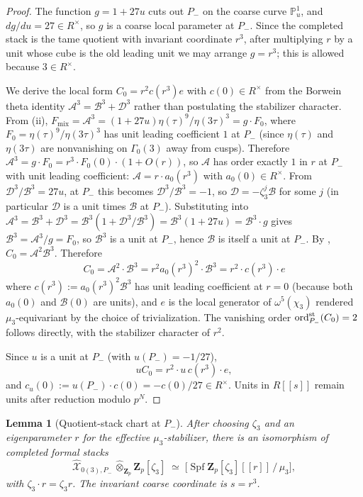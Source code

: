 \documentclass[11pt]{amsart}
\newtheorem{lemma}[theorem]{Lemma}
\theoremstyle{definition}
\theoremstyle{remark}
\newcommand{\Z}{\mathbf{Z}}
\newcommand{\ord}{\operatorname{ord}}
\begin{document}
\begin{proof}
The function $g=1+27u$ cuts out $P_-$ on the coarse curve $\mathbb P^1_u$, and $dg/du=27\in R^\times$, so $g$ is a coarse local parameter at $P_-$. Since the completed stack is the tame quotient with invariant coordinate $r^3$, after multiplying $r$ by a unit whose cube is the old leading unit we may arrange $g=r^3$; this is allowed because $3\in R^\times$.

We derive the local form $C_0=r^2c(r^3)e$ with $c(0)\in R^\times$ from the Borwein theta identity $\mathcal A^3=\mathcal B^3+\mathcal D^3$ rather than postulating the stabilizer character. From (ii), $F_{\mathrm{mix}}=\mathcal A^3=(1+27u)\eta(\tau)^9/\eta(3\tau)^3=g\cdot F_0$, where $F_0=\eta(\tau)^9/\eta(3\tau)^3$ has unit leading coefficient $1$ at $P_-$ (since $\eta(\tau)$ and $\eta(3\tau)$ are nonvanishing on $\Gamma_0(3)$ away from cusps). Therefore $\mathcal A^3=g\cdot F_0=r^3\cdot F_0(0)\cdot(1+O(r))$, so $\mathcal A$ has order exactly $1$ in $r$ at $P_-$ with unit leading coefficient: $\mathcal A=r\cdot a_0(r^3)$ with $a_0(0)\in R^\times$. From $\mathcal D^3/\mathcal B^3=27u$, at $P_-$ this becomes $\mathcal D^3/\mathcal B^3=-1$, so $\mathcal D=-\zeta_3^j\mathcal B$ for some $j$ (in particular $\mathcal D$ is a unit times $\mathcal B$ at $P_-$). Substituting into $\mathcal A^3=\mathcal B^3+\mathcal D^3=\mathcal B^3(1+\mathcal D^3/\mathcal B^3)=\mathcal B^3(1+27u)=\mathcal B^3\cdot g$ gives $\mathcal B^3=\mathcal A^3/g=F_0$, so $\mathcal B^3$ is a unit at $P_-$, hence $\mathcal B$ is itself a unit at $P_-$. By , $C_0=\mathcal A^2\mathcal B^3$. Therefore
\[
C_0=\mathcal A^2\cdot\mathcal B^3=r^2a_0(r^3)^2\cdot\mathcal B^3=r^2\cdot c(r^3)\cdot e
\]
where $c(r^3):=a_0(r^3)^2\mathcal B^3$ has unit leading coefficient at $r=0$ (because both $a_0(0)$ and $\mathcal B(0)$ are units), and $e$ is the local generator of $\omega^5(\chi_3)$ rendered $\mu_3$-equivariant by the choice of trivialization. The vanishing order $\ord^{\rm st}_{P_-}(C_0)=2$ follows directly, with the stabilizer character of $r^2$.

Since $u$ is a unit at $P_-$ (with $u(P_-)=-1/27$),
\[
uC_0=r^2\cdot u\,c(r^3)\cdot e,
\]
and $c_u(0):=u(P_-)\cdot c(0)=-c(0)/27\in R^\times$. Units in $R[[s]]$ remain units after reduction modulo $p^N$.
\end{proof}

\begin{lemma}[Quotient-stack chart at $P_-$]\label{lem:quotient-stack-chart}
After choosing $\zeta_3$ and an eigenparameter $r$ for the effective $\mu_3$-stabilizer, there is an isomorphism of completed formal stacks
\[
\widehat{\mathcal X}_{0(3),P_-}\,\widehat\otimes_{\Z_p}\Z_p[\zeta_3]\;\simeq\;\bigl[\operatorname{Spf}\Z_p[\zeta_3][[r]]\,\big/\,\mu_3\bigr],
\]
with $\zeta_3\cdot r=\zeta_3 r$. The invariant coarse coordinate is $s=r^3$.
\end{lemma}
\end{document}
